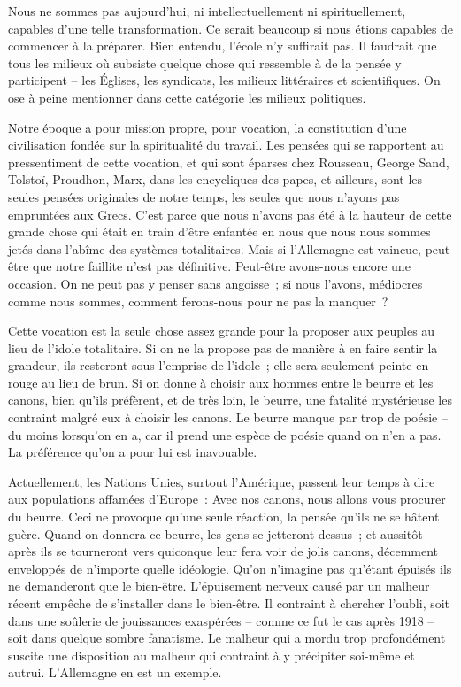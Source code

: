 \documentclass[french,twoside]{book} %
\begin{document}
Nous ne sommes pas aujourd'hui, ni intellectuellement ni spirituellement, capables d'une telle transformation. Ce serait beaucoup si nous étions capables de commencer à la préparer. Bien entendu, l'école n'y suffirait pas. Il faudrait que tous les milieux où subsiste quelque chose qui ressemble à de la pensée y participent – les Églises, les syndicats, les milieux littéraires et scientifiques. On ose à peine mentionner dans cette catégorie les milieux politiques.\par
Notre époque a pour mission propre, pour vocation, la constitution d'une civilisation fondée sur la spiritualité du travail. Les pensées qui se rapportent au pressentiment de cette vocation, et qui sont éparses chez Rousseau, George Sand, Tolstoï, Proudhon, Marx, dans les encycliques des papes, et ailleurs, sont les seules pensées originales de notre temps, les seules que nous n'ayons pas empruntées aux Grecs. C'est parce que nous n'avons pas été à la hauteur de cette grande chose qui était en train d'être enfantée en nous que nous nous sommes jetés dans l'abîme des systèmes totalitaires. Mais si l'Allemagne est vaincue, peut-être que notre faillite n'est pas définitive. Peut-être avons-nous encore une occasion. On ne peut pas y penser sans angoisse ; si nous l'avons, médiocres comme nous sommes, comment ferons-nous pour ne pas la manquer ?\par
Cette vocation est la seule chose assez grande pour la proposer aux peuples au lieu de l'idole totalitaire. Si on ne la propose pas de manière à en faire sentir la grandeur, ils resteront sous l'emprise de l'idole ; elle sera seulement peinte en rouge au lieu de brun. Si on donne à choisir aux hommes entre le beurre et les canons, bien qu'ils préfèrent, et de très loin, le beurre, une fatalité mystérieuse les contraint malgré eux à choisir les canons. Le beurre manque par trop de poésie – du moins lorsqu'on en a, car il prend une espèce de poésie quand on n'en a pas. La préférence qu’on a pour lui est inavouable.\par
Actuellement, les Nations Unies, surtout l'Amérique, passent leur temps à dire aux populations affamées d'Europe : Avec nos canons, nous allons vous procurer du beurre. Ceci ne provoque qu'une seule réaction, la pensée qu'ils ne se hâtent guère. Quand on donnera ce beurre, les gens se jetteront dessus ; et aussitôt après ils se tourneront vers quiconque leur fera voir de jolis canons, décemment enveloppés de n'importe quelle idéologie. Qu'on n'imagine pas qu'étant épuisés ils ne demanderont que le bien-être. L'épuisement nerveux causé par un malheur récent empêche de s'installer dans le bien-être. Il contraint à chercher l'oubli, soit dans une soûlerie de jouissances exaspérées – comme ce fut le cas après 1918 – soit dans quelque sombre fanatisme. Le malheur qui a mordu trop profondément suscite une disposition au malheur qui contraint à y précipiter soi-même et autrui. L'Allemagne en est un exemple.\par
\end{document}
